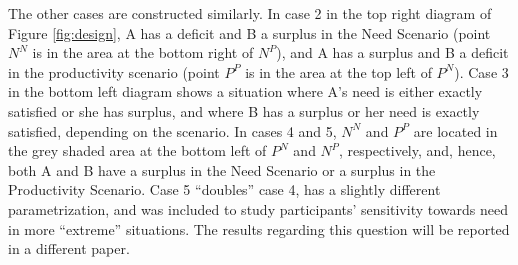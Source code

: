 \documentclass[smallcondensed]{svjour3}
\begin{document}
%
The other cases are constructed similarly. In case 2 in the top right diagram of Figure \ref{fig:design}, A has a deficit and B a surplus in the Need Scenario (point $N^N$ is in the area at the bottom right of $N^P$), and A has a surplus and B a deficit in the productivity scenario (point $P^P$ is in the area at the top left of $P^N$). Case 3 in the bottom left diagram shows a situation where A's need is either exactly satisfied or she has surplus, and where B has a surplus or her need is exactly satisfied, depending on the scenario. In cases 4 and 5, $N^N$ and $P^P$ are located in the grey shaded area at the bottom left of $P^N$ and $N^P$, respectively, and, hence, both A and B have a surplus in the Need Scenario or a surplus in the Productivity Scenario. Case 5 ``doubles'' case 4, has a slightly different parametrization, and was included to study participants' sensitivity towards need in more ``extreme'' situations. The results regarding this question will be reported in a different paper.\par
%
\end{document}
